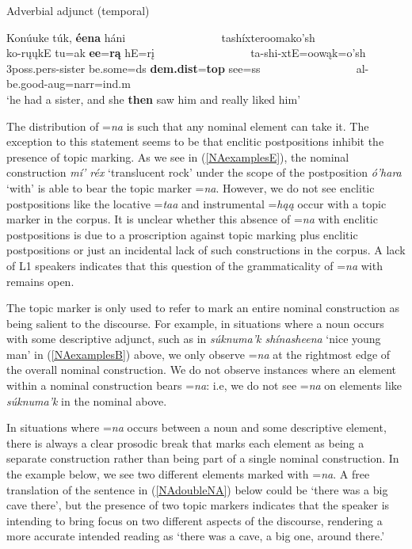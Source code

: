 \begin{exe}
\begin{xlist}
\item\label{NAexamplesG} Adverbial adjunct (temporal)

    \glll Konúuke túk, \textbf{éena} háni ~ ~ ~ ~ ~ ~ ~ ~ ~ ~ tashíxteroomako'sh\\
    ko-rųųkE tu=ak \textbf{ee}=\textbf{rą} hE=rį ~ ~ ~ ~ ~ ~ ~ ~ ~ ~ ta-shi-xtE=oowąk=o'sh\\
    3poss.pers-\textnormal{sister} \textnormal{be.some}=ds \textbf{dem.dist}=\textbf{top} \textnormal{see}=ss ~ ~ ~ ~ ~ ~ ~ ~ ~ ~ al-\textnormal{be.good}-aug=narr=ind.m\\
    \glt `he had a sister, and she \textbf{then} saw him and really liked him' \citep[134]{hollow1973a} 

\end{xlist}

\end{exe}

The distribution of =\textit{na} is such that any nominal element can take it. The exception to this statement seems to be that enclitic postpositions inhibit the presence of topic marking. As we see in (\ref{NAexamplesE}), the nominal construction \textit{mí' réx} `translucent rock' under the scope of the postposition \textit{ó'hara} `with' is able to bear the topic marker =\textit{na}. However, we do not see enclitic postpositions like the locative =\textit{taa} and instrumental =\textit{hąą} occur with a topic marker in the corpus. It is unclear whether this absence of =\textit{na} with enclitic postpositions is due to a proscription against topic marking plus enclitic postpositions or just an incidental lack of such constructions in the corpus. A lack of L1 speakers indicates that this question of the grammaticality of =\textit{na} with remains open.

The topic marker is only used to refer to mark an entire nominal construction as being salient to the discourse. For example, in situations where a noun occurs with some descriptive adjunct, such as in \textit{súknuma'k shínasheena} `nice young man' in (\ref{NAexamplesB}) above, we only observe =\textit{na} at the rightmost edge of the overall nominal construction. We do not observe instances where an element within a nominal construction bears =\textit{na}: i.e, we do not see =\textit{na} on elements like \textit{súknuma'k} in the nominal above.

In situations where =\textit{na} occurs between a noun and some descriptive element, there is always a clear prosodic break that marks each element as being a separate construction rather than being part of a single nominal construction. In the example below, we see two different elements marked with =\textit{na}. A free translation of the sentence in (\ref{NAdoubleNA}) below could be `there was a big cave there', but the presence of two topic markers indicates that the speaker is intending to bring focus on two different aspects of the discourse, rendering a more accurate intended reading as `there was a cave, a big one, around there.'


